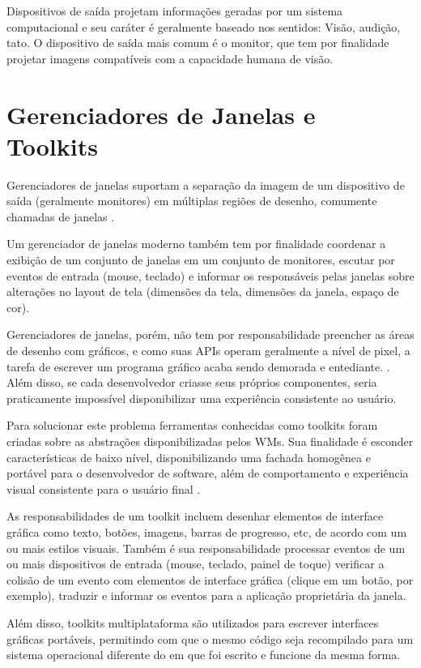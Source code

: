 Dispositivos de saída projetam informações geradas por um sistema computacional
e seu caráter é geralmente baseado nos sentidos: Visão, audição, tato. O
dispositivo de saída mais comum é o monitor, que tem por finalidade projetar
imagens compatíveis com a capacidade humana de visão.

\section{Gerenciadores de Janelas e Toolkits}

Gerenciadores de janelas suportam a separação da imagem de um dispositivo de
saída (geralmente monitores) em múltiplas regiões de desenho, comumente chamadas
de janelas  \cite[p. 5]{myers1996uimss}.

Um gerenciador de janelas moderno também tem por finalidade coordenar a exibição
de um conjunto de janelas em um conjunto de monitores, escutar por eventos de
entrada (mouse, teclado) e informar os responsáveis pelas janelas sobre
alterações no layout de tela (dimensões da tela, dimensões da janela, espaço de
cor).

Gerenciadores de janelas, porém, não tem por responsabilidade preencher as áreas
de desenho com gráficos, e como suas APIs operam geralmente a nível de pixel, a
tarefa de escrever um programa gráfico acaba sendo demorada e entediante.
. Além disso, se cada
desenvolvedor criasse seus próprios componentes, seria praticamente impossível
disponibilizar uma experiência consistente ao usuário.

Para solucionar este problema ferramentas conhecidas como toolkits foram criadas
sobre as abstrações disponibilizadas pelos WMs. Sua finalidade é esconder
características de baixo nível, disponibilizando uma fachada homogênea e
portável para o desenvolvedor de software, além de comportamento e experiência
visual consistente para o usuário final \cite{myers2000past}.

As responsabilidades de um toolkit incluem desenhar elementos de interface
gráfica como texto, botões, imagens, barras de progresso, etc, de acordo com um
ou mais estilos visuais. Também é sua responsabilidade processar eventos de um
ou mais dispositivos de entrada (mouse, teclado, painel de toque) verificar a
colisão de um evento com elementos de interface gráfica (clique em um botão, por
exemplo), traduzir e informar os eventos para a aplicação proprietária da
janela.

Além disso, toolkits multiplataforma são utilizados para escrever interfaces
gráficas portáveis, permitindo com que o mesmo código seja recompilado para um
sistema operacional diferente do em que foi escrito e funcione da mesma forma.

